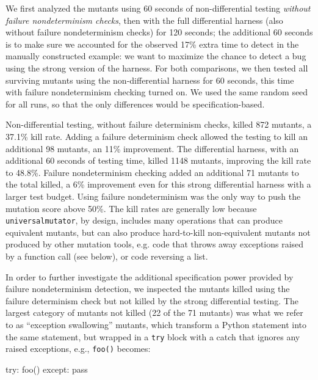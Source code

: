 We first analyzed the mutants using 60 seconds of non-differential
testing \emph{without failure nondeterminism checks}, then with the
full differential harness (also without failure nondeterminism checks)
for 120 seconds; the additional 60 seconds is to make sure we accounted for the observed 17\%
extra time to detect in the manually constructed example: we want to
maximize the chance to detect a bug using the strong version of the harness.   For both comparisons, we then tested
all surviving mutants using the non-differential harness for 60
seconds, this time with failure nondeterminism checking turned on.
We used the same random seed for
all runs, so that the only differences would be specification-based.

Non-differential testing, without failure determinism checks, killed
872 mutants, a 37.1\% kill rate.  Adding a failure determinism check
allowed the testing to kill an additional 98 mutants, an 11\% improvement.
The differential harness, with an additional 60 seconds of testing
time, killed 1148 mutants, improving the kill rate to 48.8\%.  Failure
nondeterminism checking added an
additional 71 mutants to the total killed, a 6\% improvement even for
this strong differential harness with a larger test budget.  Using
failure nondeterminism was the only way to push the mutation score
above 50\%.  The kill rates are generally low
because {\tt universalmutator}, by design, includes many operations
that can produce equivalent mutants, but can also produce hard-to-kill
non-equivalent mutants not produced by other mutation tools, e.g. code
that throws away exceptions raised by a function call (see below), or code
reversing a list.

In order to further investigate the additional specification power
provided by failure nondeterminism detection, we inspected the mutants
killed using the failure determinism check but not killed by the
strong differential testing.  The largest category of mutants not
killed (22 of the 71 mutants) was what we refer to as ``exception
swallowing'' mutants, which transform a Python statement into the same
statement, but wrapped in a {\tt try} block with a catch that ignores
any raised exceptions, e.g., {\tt foo()} becomes:

\begin{code}
try: foo()
except: pass
\end{code}

